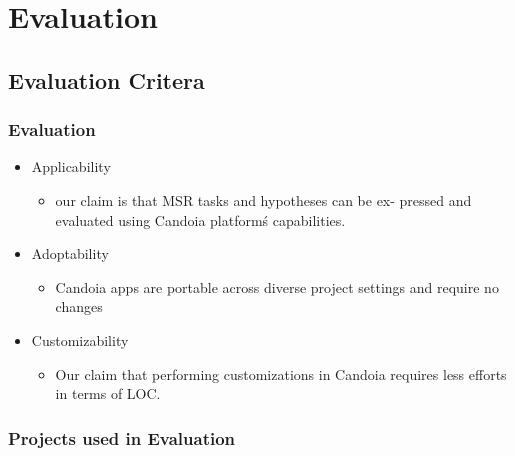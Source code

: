 \section{Evaluation}
    \subsection{Evaluation Critera}
        \begin{frame}
            \frametitle{Evaluation}
            \begin{itemize}
                \item Applicability
                    \begin{itemize}
                        \item our claim is that MSR tasks and hypotheses can be ex- pressed and evaluated using Candoia platform\'s capabilities.
                    \end{itemize}
                \item Adoptability
                    \begin{itemize}
                        \item Candoia apps are portable across diverse project settings and require no changes
                    \end{itemize}
                \item Customizability
                    \begin{itemize}
                        \item Our claim that performing customizations in Candoia requires less efforts in terms of LOC.
                    \end{itemize}
            \end{itemize}
         \end{frame}

        \begin{frame}
            \frametitle{Projects used in Evaluation}
            
         \end{frame}

